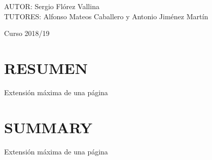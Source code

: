 \documentclass[spanish,12pt, a4paper,twoside]{paper}
\let\oldsection\section
\def\section{\cleardoublepage\oldsection}
\newcommand\blankpage{
    \null
    \thispagestyle{empty}
    \addtocounter{page}{-1}
    \newpage
}
\begin{document}
\begin{titlepage}
        \begin{flushright}
            \large
            AUTOR: Sergio Flórez Vallina\\
            TUTORES: Alfonso Mateos Caballero y \linebreak
            Antonio Jiménez Martín
        \end{flushright}

        \vspace{1.3cm}

        { {Curso 2018/19}}\\[3cm]

        \vfill

    \end{titlepage}

    \afterpage{\blankpage}


    \section*{RESUMEN}
    Extensión máxima de una página


    \section*{SUMMARY}
    Extensión máxima de una página


    \tableofcontents %



    \listoffigures

    \listoftables

    \newpage


    
    \newpage
\end{document}

